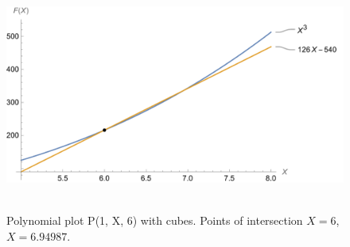 ﻿\begin{figure}[H]
    \centering
    \includegraphics[width=1\textwidth]{sections/images/01_plots_polynomial_p1_n6_with_cubes}
    ~\caption{Polynomial plot P(1, X, 6) with cubes. Points of intersection $X=6$, $X=6.94987$.}\label{fig:figure7}
\end{figure}
